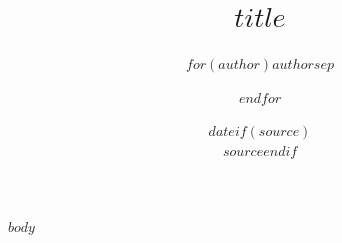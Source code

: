 \documentclass[11pt]{article}
\title{$title$}
\author{$for(author)$$author$$sep$ \and $endfor$}
\date{$date$$if(source)$\\[1ex] \small $source$$endif$} %
\begin{document}
\maketitle

$body$
\end{document}
